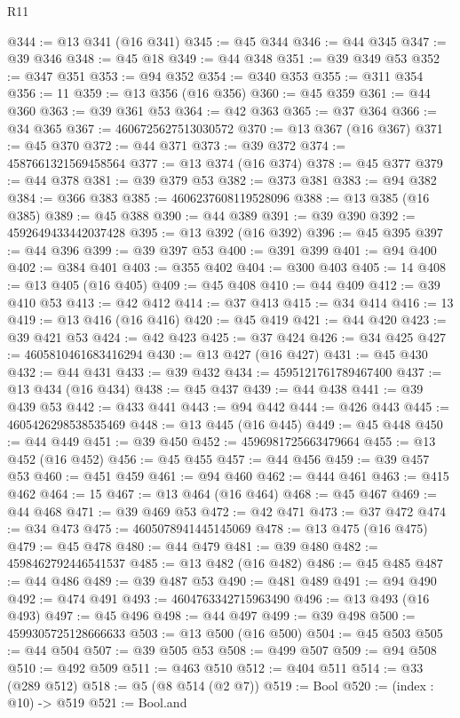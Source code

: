 \begin{lexlean}{R11}
\begin{coremodule}
@344 := @13 @341 (@16 @341)
@345 := @45 @344
@346 := @44 @345
@347 := @39 @346
@348 := @45 @18
@349 := @44 @348
@351 := @39 @349 @53
@352 := @347 @351
@353 := @94 @352
@354 := @340 @353
@355 := @311 @354
@356 := 11
@359 := @13 @356 (@16 @356)
@360 := @45 @359
@361 := @44 @360
@363 := @39 @361 @53
@364 := @42 @363
@365 := @37 @364
@366 := @34 @365
@367 := 4606725627513030572
@370 := @13 @367 (@16 @367)
@371 := @45 @370
@372 := @44 @371
@373 := @39 @372
@374 := 4587661321569458564
@377 := @13 @374 (@16 @374)
@378 := @45 @377
@379 := @44 @378
@381 := @39 @379 @53
@382 := @373 @381
@383 := @94 @382
@384 := @366 @383
@385 := 4606237608119528096
@388 := @13 @385 (@16 @385)
@389 := @45 @388
@390 := @44 @389
@391 := @39 @390
@392 := 4592649433442037428
@395 := @13 @392 (@16 @392)
@396 := @45 @395
@397 := @44 @396
@399 := @39 @397 @53
@400 := @391 @399
@401 := @94 @400
@402 := @384 @401
@403 := @355 @402
@404 := @300 @403
@405 := 14
@408 := @13 @405 (@16 @405)
@409 := @45 @408
@410 := @44 @409
@412 := @39 @410 @53
@413 := @42 @412
@414 := @37 @413
@415 := @34 @414
@416 := 13
@419 := @13 @416 (@16 @416)
@420 := @45 @419
@421 := @44 @420
@423 := @39 @421 @53
@424 := @42 @423
@425 := @37 @424
@426 := @34 @425
@427 := 4605810461683416294
@430 := @13 @427 (@16 @427)
@431 := @45 @430
@432 := @44 @431
@433 := @39 @432
@434 := 4595121761789467400
@437 := @13 @434 (@16 @434)
@438 := @45 @437
@439 := @44 @438
@441 := @39 @439 @53
@442 := @433 @441
@443 := @94 @442
@444 := @426 @443
@445 := 4605426298538535469
@448 := @13 @445 (@16 @445)
@449 := @45 @448
@450 := @44 @449
@451 := @39 @450
@452 := 4596981725663479664
@455 := @13 @452 (@16 @452)
@456 := @45 @455
@457 := @44 @456
@459 := @39 @457 @53
@460 := @451 @459
@461 := @94 @460
@462 := @444 @461
@463 := @415 @462
@464 := 15
@467 := @13 @464 (@16 @464)
@468 := @45 @467
@469 := @44 @468
@471 := @39 @469 @53
@472 := @42 @471
@473 := @37 @472
@474 := @34 @473
@475 := 4605078941445145069
@478 := @13 @475 (@16 @475)
@479 := @45 @478
@480 := @44 @479
@481 := @39 @480
@482 := 4598462792446541537
@485 := @13 @482 (@16 @482)
@486 := @45 @485
@487 := @44 @486
@489 := @39 @487 @53
@490 := @481 @489
@491 := @94 @490
@492 := @474 @491
@493 := 4604763342715963490
@496 := @13 @493 (@16 @493)
@497 := @45 @496
@498 := @44 @497
@499 := @39 @498
@500 := 4599305725128666633
@503 := @13 @500 (@16 @500)
@504 := @45 @503
@505 := @44 @504
@507 := @39 @505 @53
@508 := @499 @507
@509 := @94 @508
@510 := @492 @509
@511 := @463 @510
@512 := @404 @511
@514 := @33 (@289 @512)
@518 := @5 (@8 @514 (@2 @7))
@519 := Bool
@520 := (index : @10) -> @519
@521 := Bool.and

\end{coremodule}
\end{lexlean}
